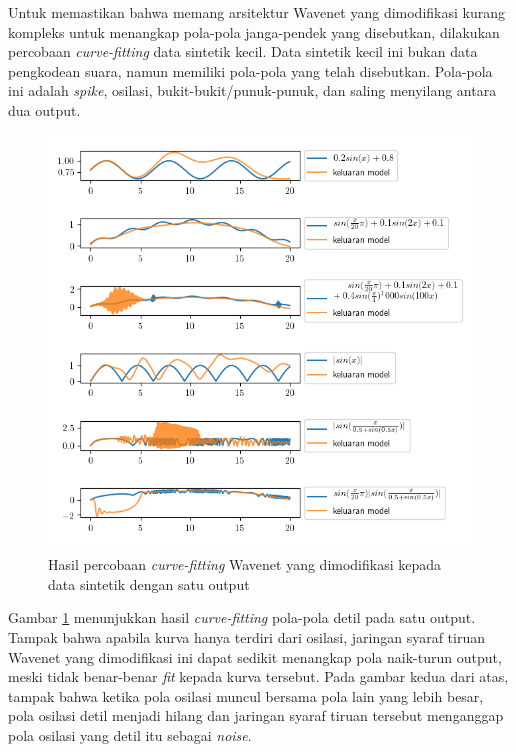 Untuk memastikan bahwa memang arsitektur Wavenet yang dimodifikasi kurang kompleks untuk menangkap pola-pola janga-pendek yang disebutkan, dilakukan percobaan \textit{curve-fitting} data sintetik kecil. Data sintetik kecil ini bukan data pengkodean suara, namun memiliki pola-pola yang telah disebutkan. Pola-pola ini adalah \textit{spike}, osilasi, bukit-bukit/punuk-punuk, dan saling menyilang antara dua output.

\begin{figure}[htbp]
    \centering
    \includegraphics[width=\textwidth]{resources/analisis_modified_wavenet.png}
    \caption{Hasil percobaan \textit{curve-fitting} Wavenet yang dimodifikasi kepada data sintetik dengan satu output}\label{fig-curvefit-modified-wavenet}
\end{figure}

Gambar \ref{fig-curvefit-modified-wavenet} menunjukkan hasil \textit{curve-fitting} pola-pola detil pada satu output. Tampak bahwa apabila kurva hanya terdiri dari osilasi, jaringan syaraf tiruan Wavenet yang dimodifikasi ini dapat sedikit menangkap pola naik-turun output, meski tidak benar-benar \textit{fit} kepada kurva tersebut. Pada gambar kedua dari atas, tampak bahwa ketika pola osilasi muncul bersama pola lain yang lebih besar, pola osilasi detil menjadi hilang dan jaringan syaraf tiruan tersebut menganggap pola osilasi yang detil itu sebagai \textit{noise}.

